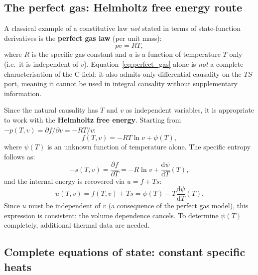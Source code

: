 \subsection{The perfect gas: Helmholtz free energy route}
\label{ssec:perfect_gas}

A classical example of a constitutive law \emph{not} stated in terms of
state-function derivatives is the \textbf{perfect gas law} (per unit mass):
\begin{equation}
  pv = RT,
  \label{eq:perfect_gas}
\end{equation}
where $R$ is the specific gas constant and $u$ is a function of temperature
$T$ only (i.e.\ it is independent of $v$).  Equation~\eqref{eq:perfect_gas}
alone is \emph{not} a complete characterisation of the C-field: it also
admits only differential causality on the $T\dot{S}$ port, meaning it
cannot be used in integral causality without supplementary information.

Since the natural causality has $T$ and $v$ as independent variables, it
is appropriate to work with the \textbf{Helmholtz free energy}.  Starting
from $-p(T,v) = \partial f/\partial v = -RT/v$:
\begin{equation}
  f(T,v) = -RT\ln v + \psi(T),
  \label{eq:helmholtz_gas}
\end{equation}
where $\psi(T)$ is an unknown function of temperature alone.  The specific
entropy follows as:
\begin{equation}
  -s(T,v) = \frac{\partial f}{\partial T} = -R\ln v + \frac{\mathrm{d}\psi}{\mathrm{d}T}(T),
  \label{eq:entropy_gas}
\end{equation}
and the internal energy is recovered via $u = f + Ts$:
\begin{equation}
  u(T,v) = f(T,v) + Ts = \psi(T) - T\frac{\mathrm{d}\psi}{\mathrm{d}T}(T).
  \label{eq:u_helmholtz}
\end{equation}
Since $u$ must be independent of $v$ (a consequence of the perfect gas
model), this expression is consistent: the volume dependence cancels.  To
determine $\psi(T)$ completely, additional thermal data are needed.


\subsection{Complete equations of state: constant specific heats}
\label{ssec:specific_heats}

